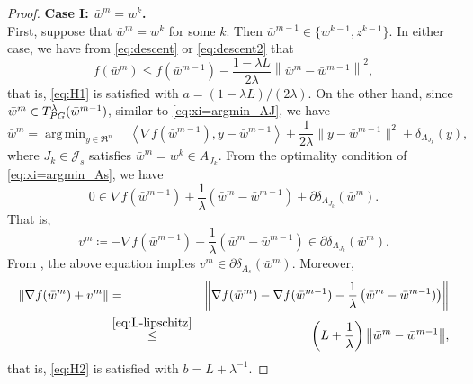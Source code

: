 \documentclass{article}
\theoremstyle{plain}
\theoremstyle{definition}
\theoremstyle{remark}
\newcommand{\J}{\mathcal{J}}
\newcommand\inner[2]{\left\langle #1, #2 \right\rangle}
\newcommand{\Tpg}{T_{\rm PG}^{\lambda}}
\DeclareMathOperator*{\argmin}{arg\,min}
\newcommand{\norm}[1]{{\left\|{#1}\right\|}}
\begin{document}
\begin{proof}
	\textbf{Case I: $\bar{w}^m = w^k$.}\\
	First, suppose 
	that $\bar{w}^m = w^k$ for some $k$. Then $\bar{w}^{m-1} \in \{ w^{k-1}, 
	z^{k-1}\}$. In either case, we have from \cref{eq:descent} or
	\cref{eq:descent2} that 
		\begin{equation}
		\label{eq:descent3}
		f(\bar{w}^{m}) \leq f(\bar{w}^{m-1}) - 
		\frac{1-\lambda L}{2\lambda}\norm{\bar{w}^{m}-\bar{w}^{m-1}}^2, 
		\end{equation}
	that is, \cref{eq:H1} is satisfied with $a = (1-\lambda L)/(2\lambda)$. 
	On the other hand, since $\bar{w}^m \in \Tpg (\bar{w}^{m-1})$, similar
	to  \cref{eq:xi=argmin_AJ}, we have
		\begin{equation}
		\label{eq:xi=argmin_As}
				\bar{w}^{m} = \argmin_{y\in \Re^n}\quad \inner{\nabla 
				f(\bar{w}^{m-1})}{y-\bar{w}^{m-1}} + 
		\frac{1}{2\lambda}\|y-\bar{w}^{m-1}\|^2 + \delta_{A_{J_k}}(y),
		\end{equation}
	where $J_k\in \J_s$ satisfies $\bar{w}^m = w^k \in A_{J_k}$. From the 
	optimality condition of \cref{eq:xi=argmin_As}, we have
		\begin{equation}
		\label{eq:optimality condition}
		0\in \nabla f(\bar{w}^{m-1} )+ \frac{1}{\lambda}\left( \bar{w}^m - 
		\bar{w}^{m-1}\right)  + \partial \delta_{A_{J_k}}(\bar{w}^m).
		\end{equation}
	That is, 
		\begin{equation*}
		v^m \coloneqq  - \nabla f(\bar{w}^{m-1} ) - \frac{1}{\lambda}\left( 
		\bar{w}^m - 
		\bar{w}^{m-1}\right) \in  \partial \delta_{A_{J_k}} (\bar{w}^m).
		\end{equation*}
	From \cite[Equation~(19)]{HLN14}, the above equation implies $v^m\in \partial
	\delta_{A_s}(\bar{w}^m)$. Moreover, 
		\begin{eqnarray}
		\norm{\nabla f(\bar{w}^m) + v^m}& = &  \norm{\nabla f(\bar{w}^m)- 
\nabla f(\bar{w}^{m-1} ) - \frac{1}{\lambda}\left( 
		\bar{w}^m - \bar{w}^{m-1})\right)} \nonumber \\
		& \overset{\cref{eq:L-lipschitz}}{\leq} & \left( L + 
		\frac{1}{\lambda}\right)\norm{\bar{w}^m - \bar{w}^{m-1}},
		\end{eqnarray}
		that is, \cref{eq:H2} is satisfied with $b = L+\lambda^{-1}$. 
	

\end{proof}
\end{document}
